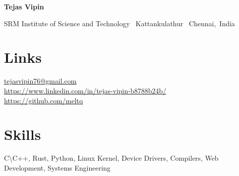\documentclass{OpenCV}
\newlength{\hvspace}
\begin{document}
\begin{center}
    \noindent\textbf{\LARGE Tejas Vipin} \\
\end{center}
\vspace{\hvspace}
\hrulefill
\vspace{\hvspace}
\begin{center}
    \noindent SRM Institute of Science and Technology \textbullet\ Kattankulathur \textbullet\ Chennai,\, India \\
\end{center}
\vspace{\hvspace}
\vspace{-4pt}
\hrulefill
\vspace{-12pt}

\section*{Links}
\faEnvelopeO\enskip \href{mailto:tejasvipin76@gmail.com}{tejasvipin76@gmail.com} \\
\faLinkedin\enskip\href{https://www.linkedin.com/in/tejas-vipin-b8788b24b/}{https://www.linkedin.com/in/tejas-vipin-b8788b24b/} \\
\faGithub\enskip\href{https://github.com/meltq}{https://github.com/meltq} \\

\section*{Skills}
C{\textbackslash}C++, Rust, Python, Linux Kernel, Device Drivers, Compilers, Web Development, Systems Engineering
% 









\end{document}
